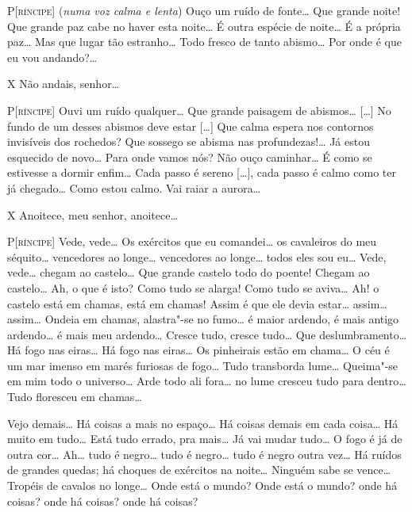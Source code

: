 \textsc{P[ríncipe]} (\textit{numa voz calma e lenta}) Ouço um ruído de
fonte\ldots{} Que grande noite! Que grande paz cabe no haver esta noite\ldots{}
É outra espécie de noite\ldots{} É a própria paz\ldots{} Mas que lugar tão
estranho\ldots{} Todo fresco de tanto abismo\ldots{} Por onde é que eu vou
andando?\ldots{} 

\textsc{X} Não andais, senhor\ldots{}

\textsc{P[ríncipe]} Ouvi um ruído qualquer\ldots{} Que grande paisagem de
abismos\ldots{} [\ldots{}] No fundo de um desses abismos deve estar [\ldots{}] Que
calma espera nos contornos invisíveis dos rochedos? Que sossego se
abisma nas profundezas!\ldots{} Já estou esquecido de novo\ldots{} Para onde
vamos nós? Não ouço caminhar\ldots{} É como se estivesse a dormir enfim\ldots{}
Cada passo é sereno [\ldots{}], cada passo é calmo como ter já chegado\ldots{}
Como estou calmo. Vai raiar a aurora\ldots{}%

\textsc{X} Anoitece, meu senhor, anoitece\ldots{}

\textsc{P[ríncipe]} Vede, vede\ldots{} Os exércitos que eu comandei\ldots{} os
cavaleiros do meu séquito\ldots{} vencedores ao longe\ldots{} vencedores ao
longe\ldots{} todos eles sou eu\ldots{} Vede, vede\ldots{} chegam ao castelo\ldots{} Que
grande castelo todo do poente! Chegam ao castelo\ldots{} Ah, o que é isto?
Como tudo se alarga! Como tudo se aviva\ldots{} Ah! o castelo está em
chamas, está em chamas! Assim é que ele devia estar\ldots{} assim\ldots{}
assim\ldots{} Ondeia em chamas, alastra"-se no fumo\ldots{} é maior ardendo, é
mais antigo ardendo\ldots{} é mais meu ardendo\ldots{} Cresce tudo, cresce
tudo\ldots{} Que deslumbramento\ldots{} Há fogo nas eiras\ldots{} Há fogo nas
eiras\ldots{} Os pinheirais estão em chama\ldots{} O céu é um mar imenso em
marés furiosas de fogo\ldots{} Tudo transborda lume\ldots{} Queima"-se em mim
todo o universo\ldots{} Arde todo ali fora… no lume cresceu tudo para
dentro\ldots{} Tudo floresceu em chamas\ldots{}

Vejo demais\ldots{} Há coisas a mais no espaço\ldots{} Há coisas demais em cada
coisa\ldots{} Há muito em tudo\ldots{} Está tudo errado, pra mais\ldots{} Já vai
mudar tudo\ldots{} O fogo é já de outra cor\ldots{} Ah\ldots{} tudo é negro\ldots{} tudo
é negro\ldots{} tudo é negro outra vez\ldots{} Há ruídos de grandes quedas; há
choques de exércitos na noite\ldots{} Ninguém sabe se vence\ldots{} Tropéis de
cavalos no longe\ldots{} Onde está o mundo? Onde está o mundo? onde há
coisas? onde há coisas? onde há coisas?%

